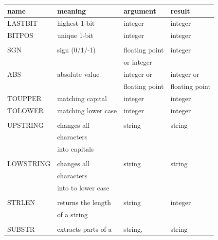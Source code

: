 \documentclass[12pt,twoside]{report}
\begin{document}
\begin{center}\begin{longtable}{|l|l|l|l|}
\hline
name        & meaning              & argument & result \\
\hline
\hline
LASTBIT     & highest 1-bit        & integer              & integer \\
BITPOS      & unique 1-bit         & integer              & integer \\
            &                      &                      & \\
SGN         & sign (0/1/-1)        & floating point       & integer \\
            &                      & or integer           & \\
ABS         & absolute value       & integer or           & integer or \\
            &                      & floating point       & floating point \\
TOUPPER     & matching capital     & integer              & integer \\
TOLOWER     & matching lower case  & integer              & integer \\
            &                      &                      & \\
UPSTRING    & changes all          & string               & string \\
            & characters           &                      & \\
            & into capitals        &                      & \\
            &                      &                      & \\
LOWSTRING   & changes all          & string               & string \\
            & characters           &                      & \\
            & into to lower case   &                      & \\
            &                      &                      & \\
STRLEN      & returns the length   & string               & integer \\
            & of a string          &                      & \\
            &                      &                      & \\
SUBSTR      & extracts parts of a  & string,              & string \\

\end{longtable}
\end{center}
\end{document}
